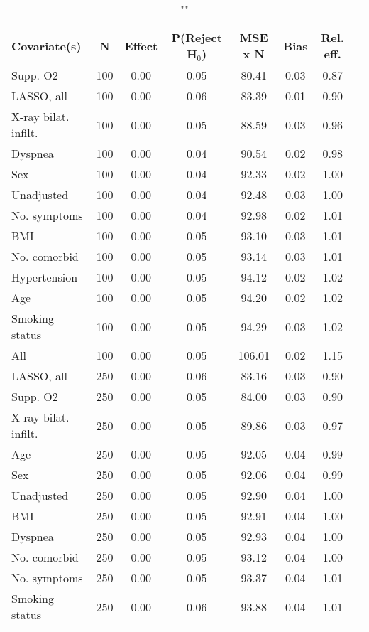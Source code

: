 \documentclass{article}
\begin{document}
{\tabcolsep=6pt  %
\begin{longtable}{lccccccc}
\caption{""} \\
Covariate(s) & N & Effect & P(Reject H$_0$) & MSE x N & Bias & Rel. eff.\\ \midrule
Supp. O2 & 100 & 0.00 & 0.05 &  80.41 &  0.03 & 0.87 \\ 
LASSO, all & 100 & 0.00 & 0.06 &  83.39 &  0.01 & 0.90 \\ 
X-ray bilat. infilt. & 100 & 0.00 & 0.05 &  88.59 &  0.03 & 0.96 \\ 
Dyspnea & 100 & 0.00 & 0.04 &  90.54 &  0.02 & 0.98 \\ 
Sex & 100 & 0.00 & 0.04 &  92.33 &  0.02 & 1.00 \\ 
Unadjusted & 100 & 0.00 & 0.04 &  92.48 &  0.03 & 1.00 \\ 
No. symptoms & 100 & 0.00 & 0.04 &  92.98 &  0.02 & 1.01 \\ 
BMI & 100 & 0.00 & 0.05 &  93.10 &  0.03 & 1.01 \\ 
No. comorbid & 100 & 0.00 & 0.05 &  93.14 &  0.03 & 1.01 \\ 
Hypertension & 100 & 0.00 & 0.05 &  94.12 &  0.02 & 1.02 \\ 
Age & 100 & 0.00 & 0.05 &  94.20 &  0.02 & 1.02 \\ 
Smoking status & 100 & 0.00 & 0.05 &  94.29 &  0.03 & 1.02 \\ 
All & 100 & 0.00 & 0.05 & 106.01 &  0.02 & 1.15 \\ \midrule 
LASSO, all & 250 & 0.00 & 0.06 &  83.16 &  0.03 & 0.90 \\ 
Supp. O2 & 250 & 0.00 & 0.05 &  84.00 &  0.03 & 0.90 \\ 
X-ray bilat. infilt. & 250 & 0.00 & 0.05 &  89.86 &  0.03 & 0.97 \\ 
Age & 250 & 0.00 & 0.05 &  92.05 &  0.04 & 0.99 \\ 
Sex & 250 & 0.00 & 0.05 &  92.06 &  0.04 & 0.99 \\ 
Unadjusted & 250 & 0.00 & 0.05 &  92.90 &  0.04 & 1.00 \\ 
BMI & 250 & 0.00 & 0.05 &  92.91 &  0.04 & 1.00 \\ 
Dyspnea & 250 & 0.00 & 0.05 &  92.93 &  0.04 & 1.00 \\ 
No. comorbid & 250 & 0.00 & 0.05 &  93.12 &  0.04 & 1.00 \\ 
No. symptoms & 250 & 0.00 & 0.05 &  93.37 &  0.04 & 1.01 \\ 
Smoking status & 250 & 0.00 & 0.06 &  93.88 &  0.04 & 1.01 \\ 

\end{longtable}}
\end{document}
